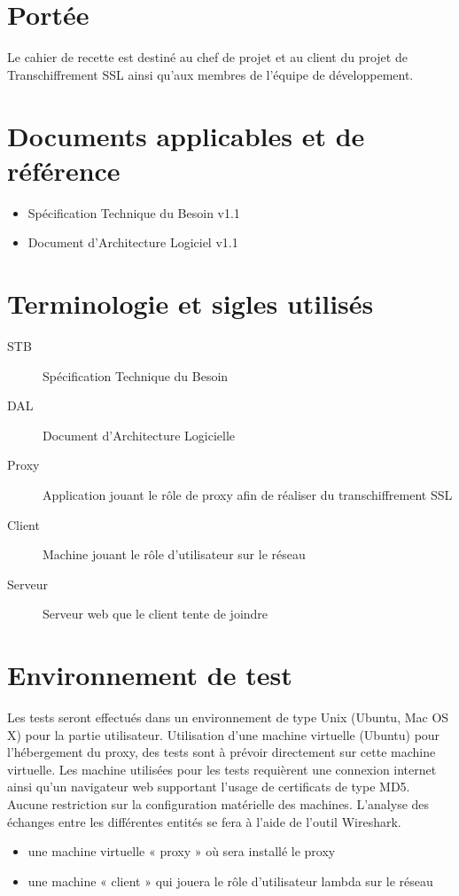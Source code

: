 \documentclass[a4paper,11pt,french]{article}
\begin{document}
\section{Portée}
Le cahier de recette est destiné au chef de projet et au client du projet de
Transchiffrement SSL ainsi qu’aux membres de l’équipe de développement.


\section{Documents applicables et de référence}

\begin{itemize}
  \item Spécification Technique du Besoin v1.1
  \item Document d'Architecture Logiciel v1.1
\end{itemize}

\section{Terminologie et sigles utilisés}

\begin{description}
  \item[STB] Spécification Technique du Besoin
  \item[DAL] Document d’Architecture Logicielle
  \item[Proxy] Application jouant le rôle de proxy afin de réaliser du transchiffrement SSL
  \item[Client] Machine jouant le rôle d'utilisateur sur le réseau
  \item[Serveur] Serveur web que le client tente de joindre
\end{description}

\section{Environnement de test}
Les tests seront effectués dans un environnement de type Unix (Ubuntu, Mac OS 
X) pour la partie utilisateur. Utilisation d'une machine virtuelle (Ubuntu) pour l'hébergement du 
proxy, des tests sont à prévoir directement sur cette machine virtuelle. Les 
machine utilisées pour les tests requièrent une connexion internet ainsi qu'un
navigateur web supportant l'usage de certificats de type MD5. Aucune restriction 
sur la configuration matérielle des machines.
L'analyse des échanges entre les différentes entités se fera à l'aide de 
l'outil Wireshark.
\begin{itemize}
\item une machine virtuelle « proxy » où sera installé le proxy 
\item une machine « client » qui jouera le rôle d'utilisateur lambda sur le réseau
\end{itemize}
\end{document}
